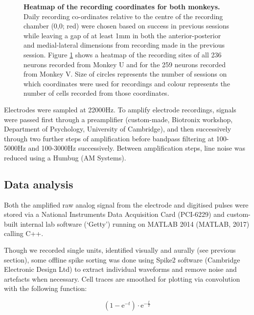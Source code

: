 \begin{figure}[htbp!] 
\centering    

\caption[Heatmap of the recording coordinates for both monkeys.]{\textbf{Heatmap of the recording coordinates for both monkeys.} Daily recording co-ordinates relative to the centre of the recording chamber (0,0; red) were chosen based on success in previous sessions while leaving a gap of at least 1mm in both the anterior-posterior and medial-lateral dimensions from recording made in the previous session. Figure \ref{fig:recording_coords} shows a heatmap of the recording sites of all 236 neurons recorded from Monkey U and for the 259 neurons recorded from Monkey V. Size of circles represents the number of sessions on which coordinates were used for recordings and colour represents the number of cells recorded from those coordinates.}
\label{fig:recording_coords}
\end{figure}

Electrodes were sampled at 22000Hz. To amplify electrode recordings, signals were passed first through a preamplifier (custom-made, Biotronix workshop, Department of Psychology, University of Cambridge), and then successively through two further steps of amplification before bandpass filtering at 100-5000Hz and 100-3000Hz successively. Between amplification steps, line noise was reduced using a Humbug (AM Systems).

\subsection{Data analysis}

Both the amplified raw analog signal from the electrode and digitised pulses were stored via a National Instruments Data Acquisition Card (PCI-6229) and custom-built internal lab software (‘Getty') running on MATLAB 2014 (MATLAB, 2017) calling C++.

Though we recorded single units, identified visually and aurally (see previous section), some offline spike sorting was done using Spike2 software (Cambridge Electronic Design Ltd) to extract individual waveforms and remove noise and artefacts when necessary.
Cell traces are smoothed for plotting via convolution with the following function:

\begin{equation}
    (1 - \mathrm{e}^{-t}) \cdot \mathrm{e}^{-\frac{t}{T}}
    \label{eq:smoothing}
\end{equation}

